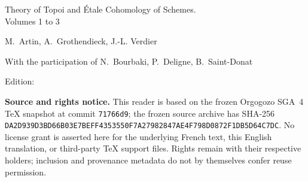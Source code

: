 \documentclass[12pt]{../fichiers-configuration-latex/amsbook}
\begin{document}
\frontmatter
\begin{center}
{\Large Theory of Topoi and Étale Cohomology of Schemes.\\
Volumes 1 to 3}\\
\end{center}

\vskip1cm
\begin{center}
M.~Artin, A.~Grothendieck, J.-L. Verdier
\end{center}

\vskip1cm
\begin{center}
With the participation of N.~Bourbaki, P.~Deligne, B.~Saint-Donat
\end{center}

\begin{center}
\small Edition: \showgitstatus
\end{center}

\clearpage
\thispagestyle{empty}
\vspace*{\fill}
\begin{center}
\begin{minipage}{0.88\textwidth}
\small
\textbf{Source and rights notice.} This reader is based on the frozen
Orgogozo SGA~4 TeX snapshot at commit \texttt{71766d9}; the frozen source
archive has SHA-256
\texttt{DA2D939D3BD66B03E7BEFF4353550F7A27982847AE4F798D0872F1DB5D64C7DC}.
No license grant is asserted here for the underlying French text, this
English translation, or third-party TeX support files. Rights remain with
their respective holders; inclusion and provenance metadata do not by
themselves confer reuse permission.
\end{minipage}
\end{center}
\vspace*{\fill}
\clearpage
\tableofcontents

\mainmatter

\def\danslelivre{1}

\def\thechapter{\Roman{chapter}}
\def\chaptername{Exposé}

\makeatletter
{}
\makeatother


\makeatletter
{}
\makeatother


\makeatletter
{}
\makeatother


\makeatletter
{}
\makeatother

\end{document}
